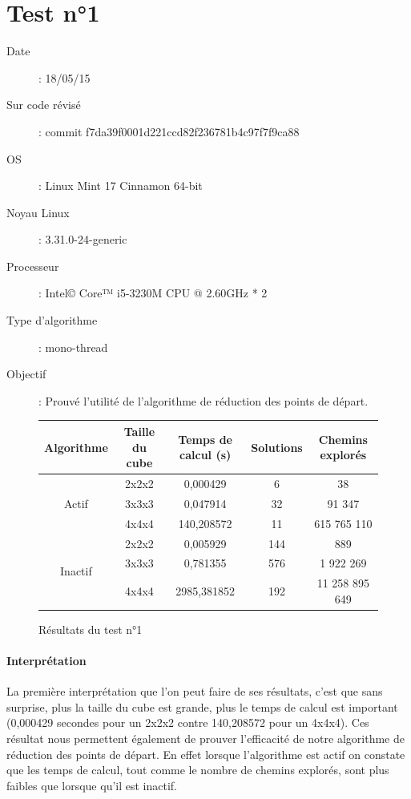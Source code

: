\section{Test n°1}

\begin{description}
 \item[Date]: 18/05/15
 \item[Sur code révisé]: commit f7da39f0001d221ccd82f236781b4c97f7f9ca88
 \item[OS]: Linux Mint 17 Cinnamon 64-bit
 \item[Noyau Linux]: 3.31.0-24-generic
 \item[Processeur]: Intel© Core™ i5-3230M CPU @ 2.60GHz * 2
 \item[Type d'algorithme]: mono-thread
 \item[Objectif]: Prouvé l'utilité de l'algorithme de réduction des points de départ.
\end{description}

\begin{figure}[h]
\begin{tabular}{|*{5}{c|}}
\hline
Algorithme&Taille du cube&Temps de calcul (s)&Solutions&Chemins explorés \\
\hline
\multirow{3}{*}{Actif}&2x2x2&0,000429&6&38 \\
&3x3x3&0,047914&32&91 347 \\
&4x4x4&140,208572&11&615 765 110 \\
\hline
\multirow{3}{*}{Inactif}&2x2x2&0,005929&144&889 \\
&3x3x3&0,781355&576&1 922 269 \\
&4x4x4&2985,381852&192&11 258 895 649 \\
\hline
\end{tabular}
\caption{Résultats du test n°1}
\end{figure}

\newpage

\paragraph{Interprétation} La première interprétation que l'on peut faire de ses résultats, c'est que sans surprise, plus la taille du cube est grande, plus le temps de calcul est important (0,000429 secondes pour un 2x2x2 contre 140,208572 pour un 4x4x4). Ces résultat nous permettent également de prouver l'efficacité de notre algorithme de réduction des points de départ. En effet lorsque l'algorithme est actif on constate que les temps de calcul, tout comme le nombre de chemins explorés, sont plus faibles que lorsque qu'il est inactif.

